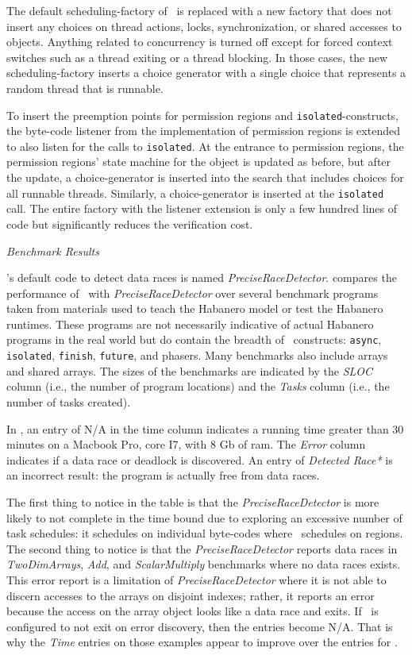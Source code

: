 The default scheduling-factory of \jpf\ is replaced with a new factory
that does not insert any choices on thread actions, locks,
synchronization, or shared accesses to objects. Anything related to
concurrency is turned off except for forced context switches such as a
thread exiting or a thread blocking. In those cases, the new
scheduling-factory inserts a choice generator with a single choice
that represents a random thread that is runnable.

To insert the preemption points for permission regions and
\texttt{isolated}-constructs, the byte-code listener from the
implementation of permission regions is extended to also listen for
the calls to \texttt{isolated}. At the
entrance to permission regions, the permission regions' state machine for the
object is updated as before, but after the update, a choice-generator
is inserted into the search that includes choices for all runnable
threads. Similarly, a choice-generator is inserted at the
\texttt{isolated} call. The entire factory with the listener extension is only a few
hundred lines of code but significantly reduces the verification
cost.

\emph{Benchmark Results}

\jpf's default code to detect data races is named
\emph{PreciseRaceDetector}.  compares the performance
of \jpfhj\ with \emph{PreciseRaceDetector} over several benchmark
programs taken from materials used to teach the Habanero model or test the Habanero
runtimes. These programs are not necessarily indicative of actual Habanero
programs in the real world but do contain the breadth
 of \hj\ constructs: {\tt async}, {\tt isolated},
{\tt finish}, {\tt future}, and phasers. Many benchmarks also include
arrays and shared arrays. The sizes of the benchmarks are
indicated by the \emph{SLOC} column (i.e., the number of program locations)
and the \emph{Tasks} column (i.e., the number of tasks created).

In , an entry of N/A in the time column indicates a
running time greater than 30 minutes on a Macbook Pro, core I7, with 8
Gb of ram. The \emph{Error} column indicates if a data race or deadlock is discovered. An entry of \emph{Detected Race*} is an incorrect
result: the program is actually free from data races.

The first thing to notice in the table is that the
\emph{PreciseRaceDetector} is more likely to not complete in the time
bound due to exploring an excessive number of task schedules: it
schedules on individual byte-codes where \jpfhj\ schedules on
regions. The second thing to notice is that the
\emph{PreciseRaceDetector} reports data races in \emph{TwoDimArrays},
\emph{Add}, and \emph{ScalarMultiply} benchmarks where no data races
exists. This error report is a limitation of
\emph{PreciseRaceDetector} where it is not able to discern accesses to
the arrays on disjoint indexes; rather, it reports an error because the access on the array object looks like a data race and exits. If \jpf\ is configured to not exit on error discovery, then the entries become N/A. That is why the \emph{Time} entries on those
examples appear to improve over the entries for \jpfhj.

